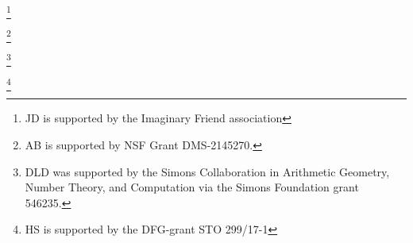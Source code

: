 \author[Doe]{Your Name Here}
\address{
  John Doe,
  Monsters University,
  Department of Mathematics,
  123 Main Street,
  Anywhere, CA
  United States of America
}
\thanks{JD is supported by the Imaginary Friend association}

\author[Bourdon]{Abbey Bourdon}
\address{
  Abbey Bourdon,
  Wake Forest University,
  Department of Mathematics, 127 Manchester Hall, PO Box 7388, Winston-Salem, NC 27109
}
\thanks{AB is supported by NSF Grant DMS-2145270.}

\author[Hashimoto]{Sachi Hashimoto}
\address{%
  Sachi Hashimoto,
  Max Planck Institut für Mathematik in den Naturwissenschaften,
  Inselstraße 22,
  04103 Leipzig
}


\author[Keller]{Timo Keller}
\address{Timo Keller, Leibniz Universität Hannover, Institut für Algebra, Zahlentheorie und Diskrete Mathematik, Welfengarten 1, 30167 Hannover, Germany}


\author[Lowry-Duda]{David Lowry-Duda}
\address{%
  David Lowry-Duda, ICERM, 121 South Main Street, Box E, 11th Floor,
  Providence, RI, 02903
}
\thanks{%
  DLD was supported by the Simons Collaboration in Arithmetic Geometry, Number
  Theory, and Computation via the Simons Foundation grant 546235.
}
\author[Morrison]{Travis Morrison}
\address{Travis Morrison, 
Virginia Tech Department of Mathematics, 
226 Stanger Street, 
24061 Blacksburg, VA USA}
\author[Najman]{Filip Najman}
\address{
Filip Najman, University of Zagreb, Bijeni\v{c}ka Cesta 30, 10000 Zagreb, Croatia
}


\author[Shukla]{Himanshu Shukla}
\address{Himanshu Shukla, Mathematisches Institut, Uiversit\"{a}t Bayreuth, Universit\"{a}tstrasse 30, 95444 Bayreuth, Germany}
\thanks{HS is supported by the DFG-grant STO 299/17-1}

